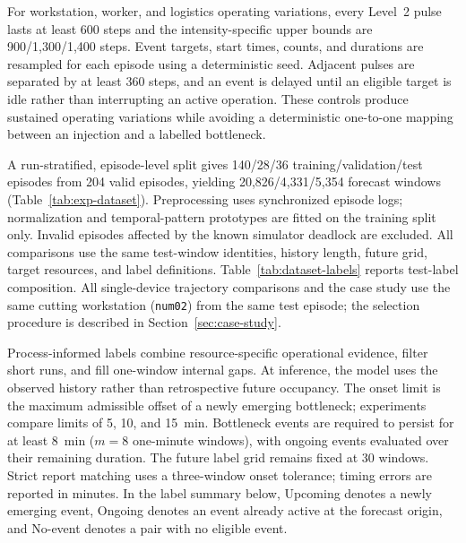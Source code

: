 For workstation, worker, and logistics operating variations, every Level~2 pulse lasts at least 600 steps and the intensity-specific upper bounds are 900/1,300/1,400 steps. Event targets, start times, counts, and durations are resampled for each episode using a deterministic seed. Adjacent pulses are separated by at least 360 steps, and an event is delayed until an eligible target is idle rather than interrupting an active operation. These controls produce sustained operating variations while avoiding a deterministic one-to-one mapping between an injection and a labelled bottleneck.

A run-stratified, episode-level split gives 140/28/36 training/validation/test episodes from 204 valid episodes, yielding 20,826/4,331/5,354 forecast windows (Table~\ref{tab:exp-dataset}). Preprocessing uses synchronized episode logs; normalization and temporal-pattern prototypes are fitted on the training split only. Invalid episodes affected by the known simulator deadlock are excluded. All comparisons use the same test-window identities, history length, future grid, target resources, and label definitions. Table~\ref{tab:dataset-labels} reports test-label composition. All single-device trajectory comparisons and the case study use the same cutting workstation (\texttt{num02}) from the same test episode; the selection procedure is described in Section~\ref{sec:case-study}.

Process-informed labels combine resource-specific operational evidence, filter short runs, and fill one-window internal gaps. At inference, the model uses the observed history rather than retrospective future occupancy. The onset limit is the maximum admissible offset of a newly emerging bottleneck; experiments compare limits of 5, 10, and 15~min. Bottleneck events are required to persist for at least 8~min ($m=8$ one-minute windows), with ongoing events evaluated over their remaining duration. The future label grid remains fixed at 30 windows. Strict report matching uses a three-window onset tolerance; timing errors are reported in minutes. In the label summary below, Upcoming denotes a newly emerging event, Ongoing denotes an event already active at the forecast origin, and No-event denotes a pair with no eligible event.

